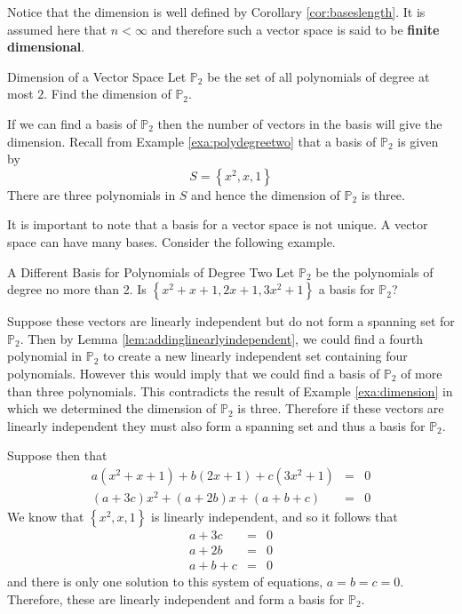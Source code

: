 Notice that the dimension is well defined by Corollary \ref{cor:baseslength}. It is assumed here
that $n<\infty $ and therefore such a vector space is said to be \textbf{finite
dimensional}.

\begin{example}{Dimension of a Vector Space}\label{exa:dimension}
Let $\mathbb{P}_2$ be the set of all polynomials of degree at most $2$. Find the dimension of $\mathbb{P}_2$. 
\end{example}

\begin{solution}
If we can find a basis of $\mathbb{P}_2$ then the number of vectors in the basis will give the dimension. Recall from Example \ref{exa:polydegreetwo} that a basis of $\mathbb{P}_2$ is given by 
\[
S  = \left\{ x^2, x, 1 \right\}
\]
There are three polynomials in $S$ and hence the dimension of $\mathbb{P}_2$ is three. 
\end{solution}

It is important to note that a basis for a vector space is not unique. A vector space can have many bases. Consider the following example.

\begin{example}{A Different Basis for Polynomials of Degree Two}\label{exa:polydegtwodifferentbasis}
Let $\mathbb{P}_2$ be the polynomials of degree no more than 2. Is $\left\{
x^{2}+x+1,2x+1,3x^{2}+1\right\} $ a basis for $\mathbb{P}_2$?
\end{example}

\begin{solution}
Suppose these vectors are linearly independent but do not form a spanning set for $\mathbb{P}_2$. Then by Lemma \ref{lem:addinglinearlyindependent}, we could find a fourth polynomial in $\mathbb{P}_2$ to create a new linearly independent 
set containing four polynomials. However this would imply that we could find a basis of $\mathbb{P}_2$ of more than three polynomials. This contradicts the result of Example \ref{exa:dimension} in which we determined the dimension of $\mathbb{P}_2$ is three.  Therefore if these vectors are linearly independent they must also form a spanning set and thus a basis for $\mathbb{P}_2$. 

Suppose then that 
\begin{eqnarray*}
a\left( x^{2}+x+1\right) +b\left( 2x+1\right) +c\left( 3x^{2}+1\right) &=& 0\\
\left( a+3c\right) x^{2}+\left( a+2b\right) x+\left( a+b+c\right) &=& 0 
\end{eqnarray*}
We know that $\left\{ x^2, x, 1 \right\}$ is linearly independent, and so it follows that  
\begin{eqnarray*}
a+3c &=& 0 \\
a+2b &=& 0 \\
a+b+c &=& 0
\end{eqnarray*}
and there is only one solution to this system of equations, $a=b=c=0$.
Therefore, these are linearly independent and form a basis for $\mathbb{P}_2$.
\end{solution}

